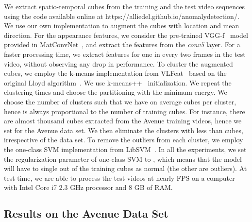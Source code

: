 \documentclass[10pt,twocolumn,letterpaper]{article}
\begin{document}
We extract spatio-temporal cubes from the training and the test video sequences using the code available online at {https://alliedel.github.io/anomalydetection/}. We use our own implementation to augment the cubes with location and mean direction. For the appearance features, we consider the pre-trained VGG-f~\cite{Chatfield-BMVC-14} model provided in MatConvNet~\cite{matconvnet}, and extract the features from the \emph{conv5} layer. For a faster processing time, we extract features for one in every two frames in the test video, without observing any drop in performance. To cluster the augmented cubes, we employ the k-means implementation from VLFeat~\cite{vedaldi-vlfeat-2008} based on the original Lloyd algorithm~\cite{Du-SIAM-1999}. We use k-means++~\cite{Arthur-SODA-2007} initialization. We repeat the clustering  times and choose the partitioning with the minimum energy. We choose the number of clusters  such that we have on average  cubes per cluster, hence  is always proportional to the number of training cubes. For instance, there are almost  thousand cubes extracted from the Avenue training videos, hence we set  for the Avenue data set. We then eliminate the clusters with less than  cubes, irrespective of the data set. To remove the outliers from each cluster, we employ the one-class SVM implementation from LibSVM~\cite{LibSVM-2011}. In all the experiments, we set the regularization parameter of one-class SVM to , which means that the model will have to single out  of the training cubes as normal (the other  are outliers). At test time, we are able to process the test videos at nearly  FPS on a computer with Intel Core i7 2.3 GHz processor and 8 GB of RAM.

\vspace*{-0.1cm}
\subsection{Results on the Avenue Data Set}
\vspace*{-0.1cm}
\end{document}
